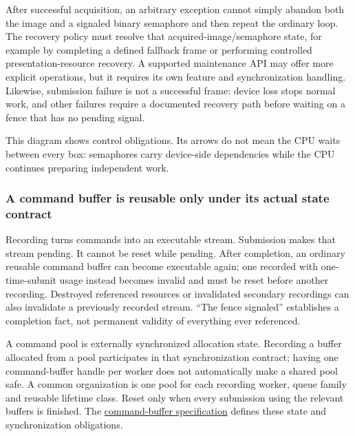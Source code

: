 After successful acquisition, an arbitrary exception cannot simply abandon both the image and a signaled binary semaphore and then repeat the ordinary loop. The recovery policy must resolve that acquired-image/semaphore state, for example by completing a defined fallback frame or performing controlled presentation-resource recovery. A supported maintenance API may offer more explicit operations, but it requires its own feature and synchronization handling. Likewise, submission failure is not a successful frame: device loss stops normal work, and other failures require a documented recovery path before waiting on a fence that has no pending signal.


This diagram shows control obligations. Its arrows do not mean the CPU waits between every box: semaphores carry device-side dependencies while the CPU continues preparing independent work.

\subsubsection{A command buffer is reusable only under its actual state contract}\label{05-engine-i-ch019-a-command-buffer-is-reusable-only-under-its-actual-state-contract}

\hypertarget{05-engine-i-ch019-a-command-buffer-is-reusable-only-under-its-actual-state-contract}{}

Recording turns commands into an executable stream. Submission makes that stream pending. It cannot be reset while pending. After completion, an ordinary reusable command buffer can become executable again; one recorded with one-time-submit usage instead becomes invalid and must be reset before another recording. Destroyed referenced resources or invalidated secondary recordings can also invalidate a previously recorded stream. ``The fence signaled'' establishes a completion fact, not permanent validity of everything ever referenced.

A command pool is externally synchronized allocation state. Recording a buffer allocated from a pool participates in that synchronization contract; having one command-buffer handle per worker does not automatically make a shared pool safe. A common organization is one pool for each recording worker, queue family and reusable lifetime class. Reset only when every submission using the relevant buffers is finished. The \href{https://docs.vulkan.org/spec/latest/chapters/cmdbuffers.html}{command-buffer specification} defines these state and synchronization obligations.

